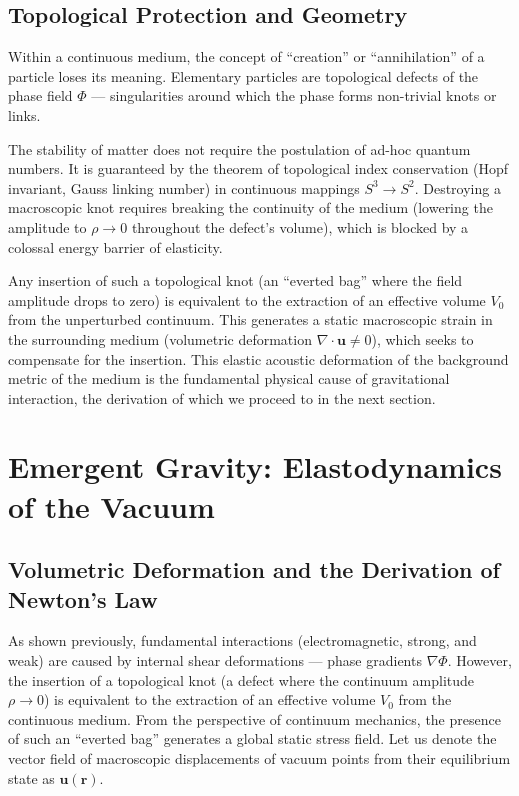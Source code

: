 \documentclass[12pt,a4paper]{article}
\begin{document}
\subsection{Topological Protection and Geometry}
Within a continuous medium, the concept of ``creation'' or ``annihilation'' of a particle loses its meaning. Elementary particles are topological defects of the phase field $\Phi$ — singularities around which the phase forms non-trivial knots or links.

The stability of matter does not require the postulation of ad-hoc quantum numbers. It is guaranteed by the theorem of topological index conservation (Hopf invariant, Gauss linking number) in continuous mappings $S^3 \to S^2$. Destroying a macroscopic knot requires breaking the continuity of the medium (lowering the amplitude to $\rho \to 0$ throughout the defect's volume), which is blocked by a colossal energy barrier of elasticity.

Any insertion of such a topological knot (an ``everted bag'' where the field amplitude drops to zero) is equivalent to the extraction of an effective volume $V_0$ from the unperturbed continuum. This generates a static macroscopic strain in the surrounding medium (volumetric deformation $\nabla \cdot \mathbf{u} \neq 0$), which seeks to compensate for the insertion. This elastic acoustic deformation of the background metric of the medium is the fundamental physical cause of gravitational interaction, the derivation of which we proceed to in the next section.

\section{Emergent Gravity: Elastodynamics of the Vacuum}

\subsection{Volumetric Deformation and the Derivation of Newton's Law}
As shown previously, fundamental interactions (electromagnetic, strong, and weak) are caused by internal shear deformations — phase gradients $\nabla \Phi$. However, the insertion of a topological knot (a defect where the continuum amplitude $\rho \to 0$) is equivalent to the extraction of an effective volume $V_0$ from the continuous medium. 
From the perspective of continuum mechanics, the presence of such an ``everted bag'' generates a global static stress field. Let us denote the vector field of macroscopic displacements of vacuum points from their equilibrium state as $\mathbf{u}(\mathbf{r})$.
\end{document}
